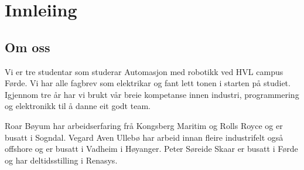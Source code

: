 \chapter{Innleiing}
\thispagestyle{fancy}

\section{Om oss}

Vi er tre studentar som studerar Automasjon med robotikk ved HVL campus Førde.
Vi har alle fagbrev som elektrikar og fant lett tonen i starten på studiet.
Igjennom tre år har vi brukt vår breie kompetanse innen industri, programmering og elektronikk
til å danne eit godt team.

Roar Bøyum har arbeidserfaring frå Kongsberg Maritim og Rolls Royce og er busatt i Sogndal.
Vegard Aven Ullebø har arbeid innan fleire industrifelt også offshore og er busatt i Vadheim i Høyanger.
Peter Søreide Skaar er busatt i Førde og har deltidsstilling i Renasys.


